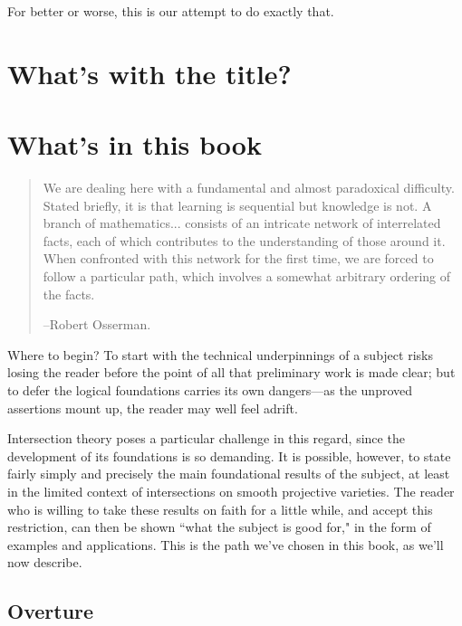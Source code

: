 For better or worse, this is our attempt to do exactly that.

\section{What's with the title?}




\section{What's in this book}


\begin{quote}
\small\sf
We are dealing here with a fundamental and almost paradoxical difficulty. Stated briefly, it is that learning is sequential but knowledge is not. A branch of mathematics... consists of an intricate network  of interrelated facts, each of which contributes to the understanding of those around it. When confronted with this network for the first time, we are forced to follow a particular path, which involves a somewhat arbitrary ordering of the facts.

--Robert Osserman.

\end{quote}



Where to begin? To start with the technical underpinnings of a subject risks losing the reader before the point of all that preliminary work is made clear; but to defer the logical foundations carries its own dangers---as the unproved assertions mount up, the reader may well feel adrift.

Intersection theory poses a particular challenge in this regard, since the development of its foundations is so demanding. It is possible, however, to state fairly simply and precisely the main foundational results of the subject, at least in the limited context of intersections on smooth projective varieties. The reader who is willing to take these results on faith for a little while, and accept this restriction, can then be shown ``what the subject is good for," in the form of examples and applications. This is the path we've chosen in this book, as we'll now describe.

\subsection{Overture}



